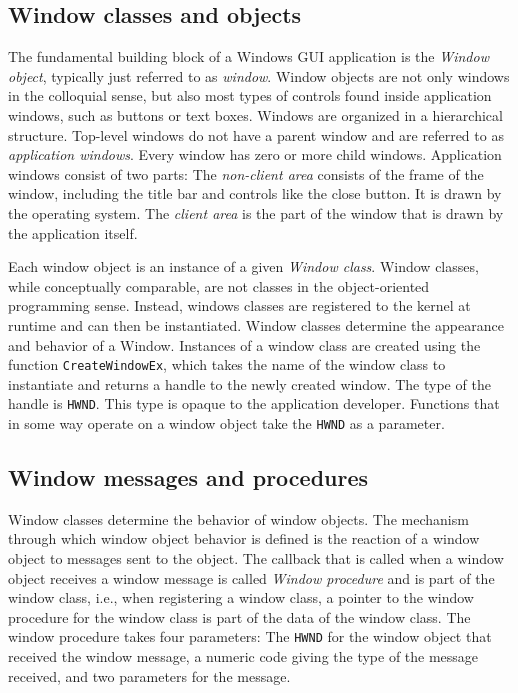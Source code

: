 \documentclass[10pt,twocolumn,a4paper]{article}
\begin{document}
		\subsection{Window classes and objects}
			The fundamental building block of a Windows GUI application is the
			\textit{Window object}, typically just referred to as \textit{window}.
			Window objects are not only windows in the colloquial sense, but also
			most types of controls found inside application windows, such as buttons
			or text boxes. Windows are organized in a hierarchical structure.
			Top-level windows do not have a parent window and are referred to as
			\textit{application windows}. Every window has zero or more child
			windows. Application windows consist of two parts: The \textit{non-client
			area} consists of the frame of the window, including the title bar and
			controls like the close button. It is drawn by the operating system.
			The \textit{client area} is the part of the window that is drawn by
			the application itself.
			\cite{whatiswindow}

			Each window object is an instance of a given \textit{Window class}.
			Window classes, while conceptually comparable, are not classes in
			the object-oriented programming sense. Instead, windows classes are
			registered to the kernel at runtime and can then be instantiated.
			Window classes determine the appearance and behavior of a Window.
			Instances of a window class are created using the function
			\texttt{CreateWindowEx}, which takes the name of the window class
			to instantiate and returns a handle to the newly created window.
			The type of the handle is \texttt{HWND}. This type is opaque to the
			application developer. Functions that in some way operate on a
			window object take the \texttt{HWND} as a parameter.
			\cite{creatingwindow,whatiswindow}

		\subsection{Window messages and procedures} %
			Window classes determine the behavior of window objects. The mechanism
			through which window object behavior is defined is the reaction of
			a window object to messages sent to the object. The callback that
			is called when a window object receives a window message is called
			\textit{Window procedure} and is part of the window class, i.e., when
			registering a window class, a pointer to the window procedure for the
			window class is part of the data of the window class. The window
			procedure takes four parameters: The \texttt{HWND} for the window
			object that received the window message, a numeric code giving the
			type of the message received, and two parameters for the message.
			\cite{aboutwinproc}
\end{document}
